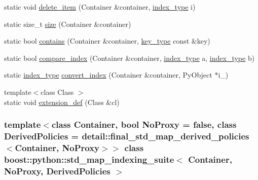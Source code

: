 \begin{DoxyCompactItemize}
\item 
static void \hyperlink{classboost_1_1python_1_1std__map__indexing__suite_a9af154020b49d26a30de90bfb07b122d}{delete\-\_\-item} (\-Container \&container, \hyperlink{classboost_1_1python_1_1std__map__indexing__suite_a4b2ac75883fba93dbca6d9e83197c842}{index\-\_\-type} i)
\item 
static size\-\_\-t \hyperlink{classboost_1_1python_1_1std__map__indexing__suite_a2a7b98e15824d0e74ae4620cbfa636d0}{size} (\-Container \&container)
\item 
static bool \hyperlink{classboost_1_1python_1_1std__map__indexing__suite_a89557475c8931027399dddf66fb251c1}{contains} (\-Container \&container, \hyperlink{classboost_1_1python_1_1std__map__indexing__suite_a4e2daeb60a58d6ce9964e0ea27680009}{key\-\_\-type} const \&key)
\item 
static bool \hyperlink{classboost_1_1python_1_1std__map__indexing__suite_a62974da613b1b56663d9736a8612bddd}{compare\-\_\-index} (\-Container \&container, \hyperlink{classboost_1_1python_1_1std__map__indexing__suite_a4b2ac75883fba93dbca6d9e83197c842}{index\-\_\-type} a, \hyperlink{classboost_1_1python_1_1std__map__indexing__suite_a4b2ac75883fba93dbca6d9e83197c842}{index\-\_\-type} b)
\item 
static \hyperlink{classboost_1_1python_1_1std__map__indexing__suite_a4b2ac75883fba93dbca6d9e83197c842}{index\-\_\-type} \hyperlink{classboost_1_1python_1_1std__map__indexing__suite_a79bc222baa6b652f2f688f2a3add9d75}{convert\-\_\-index} (\-Container \&container, \-Py\-Object $\ast$i\-\_\-)
\item 
{\footnotesize template$<$class Class $>$ }\\static void \hyperlink{classboost_1_1python_1_1std__map__indexing__suite_a32aecfee63f8763608a0149050134623}{extension\-\_\-def} (\-Class \&cl)
\end{DoxyCompactItemize}
\subsubsection*{template$<$class \-Container, bool \-No\-Proxy = false, class \-Derived\-Policies = detail\-::final\-\_\-std\-\_\-map\-\_\-derived\-\_\-policies$<$\-Container, No\-Proxy$>$$>$ class boost\-::python\-::std\-\_\-map\-\_\-indexing\-\_\-suite$<$ Container, No\-Proxy, Derived\-Policies $>$}



